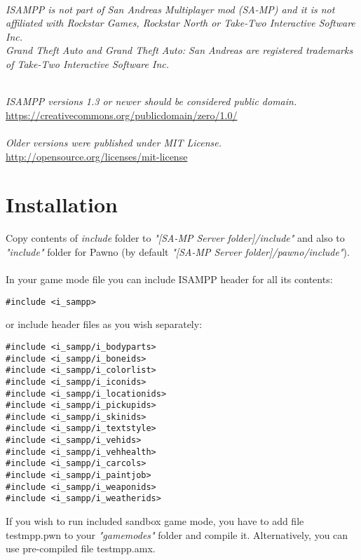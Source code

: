 \documentclass{article}
\begin{document}
\textit{\\ISAMPP is not part of San Andreas Multiplayer mod (SA-MP) and it is not affiliated with Rockstar Games, Rockstar North or Take-Two Interactive Software Inc.}
\textit{\\Grand Theft Auto and Grand Theft Auto: San Andreas are registered trademarks of Take-Two Interactive Software Inc.}

\textit{\\ISAMPP versions 1.3 or newer should be considered public domain.}
\\\url{https://creativecommons.org/publicdomain/zero/1.0/}
\\
\\\textit{Older versions were published under MIT License.}
\\\url{http://opensource.org/licenses/mit-license}

\section{Installation}
Copy contents of \textit{include} folder to \textit{"[SA-MP Server folder]/include"} and also to \textit{"include"} folder for Pawno (by default \textit{"[SA-MP Server folder]/pawno/include"}).
\\
\\
In your game mode file you can include ISAMPP header for all its contents:
\begin{verbatim}
#include <i_sampp>
\end{verbatim}
or include header files as you wish separately:
\begin{verbatim}
#include <i_sampp/i_bodyparts>
#include <i_sampp/i_boneids>
#include <i_sampp/i_colorlist>
#include <i_sampp/i_iconids>
#include <i_sampp/i_locationids>
#include <i_sampp/i_pickupids>
#include <i_sampp/i_skinids>
#include <i_sampp/i_textstyle>
#include <i_sampp/i_vehids>
#include <i_sampp/i_vehhealth>
#include <i_sampp/i_carcols>
#include <i_sampp/i_paintjob>
#include <i_sampp/i_weaponids>
#include <i_sampp/i_weatherids>
\end{verbatim}
If you wish to run included sandbox game mode, you have to add file testmpp.pwn to your \textit{"gamemodes"} folder and compile it. Alternatively, you can use pre-compiled file testmpp.amx.

\newpage
\end{document}
